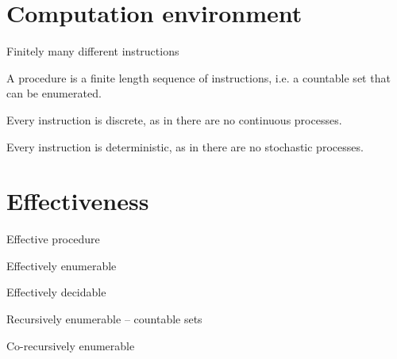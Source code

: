 \section{Computation environment}

Finitely many different instructions

A procedure is a finite length sequence of instructions, i.e. a countable set
that can be enumerated.

Every instruction is discrete, as in there are no continuous processes.

Every instruction is deterministic, as in there are no stochastic processes.

\section{Effectiveness}

Effective procedure

Effectively enumerable

Effectively decidable

Recursively enumerable -- countable sets

Co-recursively enumerable




